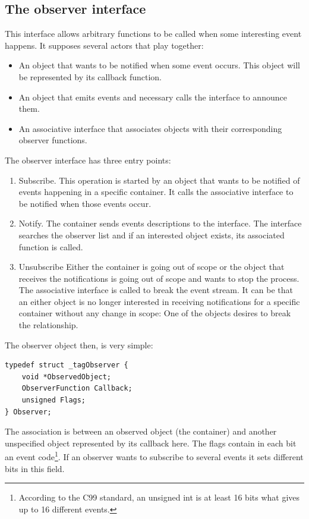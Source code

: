 \documentclass[12pt,a4paper]{memoir} %
\newcommand{\container}{}
\begin{document}
{{\subsection{The observer interface}
\renewcommand{\container}{Observer}
This interface allows arbitrary functions to be called when some interesting event happens.
It supposes several actors that play together:
\begin{itemize}
\item An object that wants to be notified when some event occurs. This object will be represented by
its callback function.
\item An object that emits events and necessary calls the interface to announce them.
\item An associative interface that associates objects with their corresponding
observer functions.
\end{itemize}
The observer interface has three entry points:
\begin{enumerate}
\item Subscribe. This operation is started by an object that wants to be notified of events
happening in a specific container. It calls the associative interface to be notified
when those events occur.
\item Notify. The container sends events descriptions to the interface. The interface searches
the observer list and if an interested object exists, its associated function is called.
\item Unsubscribe Either the container is going out of scope or the object that receives
the notifications is going out of scope and wants to stop the process. The associative
interface is called to break the event stream. It can be that an either object is no
longer interested in receiving notifications for a specific container without any
change in scope: One of the objects desires to break the relationship.
\end{enumerate}
The observer object then, is very simple:
\begin{verbatim}
typedef struct _tagObserver {
    void *ObservedObject; 
    ObserverFunction Callback; 
    unsigned Flags; 
} Observer;
\end{verbatim}
The association is between an observed object (the container) and another unspecified object represented by its
callback here. The flags contain in each bit an event code\footnote{According to the C99 standard, an unsigned int is at
least 16 bits what gives up to 16 different events.}. If an observer wants to subscribe to several events
it sets different bits in this field.

}}
\end{document}
